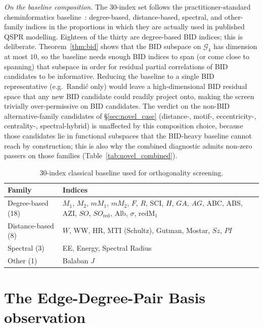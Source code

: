 \documentclass[STIX1COL]{WileyNJDv5}
\theoremstyle{definition}
\begin{document}
\noindent\emph{On the baseline composition.} The $30$-index set
follows the practitioner-standard cheminformatics
baseline~\cite{TodeschiniConsonniHandbook}: degree-based,
distance-based, spectral, and other-family indices in the
proportions in which they are actually used in published QSPR
modelling. Eighteen of the thirty are degree-based BID indices;
this is deliberate. Theorem~\ref{thm:bid} shows that the BID
subspace on $\mathcal{G}_4$ has dimension at most $10$, so the
baseline needs enough BID indices to span (or come close to
spanning) that subspace in order for residual partial
correlations of BID candidates to be informative. Reducing the
baseline to a single BID representative (e.g.\ Randi\'c only)
would leave a high-dimensional BID residual space that any new
BID candidate could readily project onto, making the screen
trivially over-permissive on BID candidates. The verdict on the
non-BID alternative-family candidates of \S\ref{sec:novel_case}
(distance-, motif-, eccentricity-, centrality-, spectral-hybrid)
is unaffected by this composition choice, because those
candidates lie in functional subspaces that the BID-heavy
baseline cannot reach by construction; this is also why the
combined diagnostic admits non-zero passers on those families
(Table~\ref{tab:novel_combined}).

\begin{table}[h]
\centering
\caption{$30$-index classical baseline used for orthogonality screening.}
\label{tab:baseline}
\small
\begin{tabular}{ll}
\toprule
Family & Indices\\
\midrule
Degree-based (18) & $M_1$, $M_2$, $mM_1$, $mM_2$, $F$, $R$, SCI, $H$, $GA$, $AG$, ABC, ABS, AZI, $SO$, $SO_{\mathrm{red}}$, Alb, $\sigma$, $\mathrm{redM}_1$\\
Distance-based (8) & $W$, WW, HR, MTI (Schultz), Gutman, Mostar, $Sz$, $PI$\\
Spectral (3) & EE, Energy, Spectral Radius\\
Other (1) & Balaban $J$\\
\bottomrule
\end{tabular}
\end{table}

\section{The Edge-Degree-Pair Basis observation}\label{sec:bid}
\end{document}

